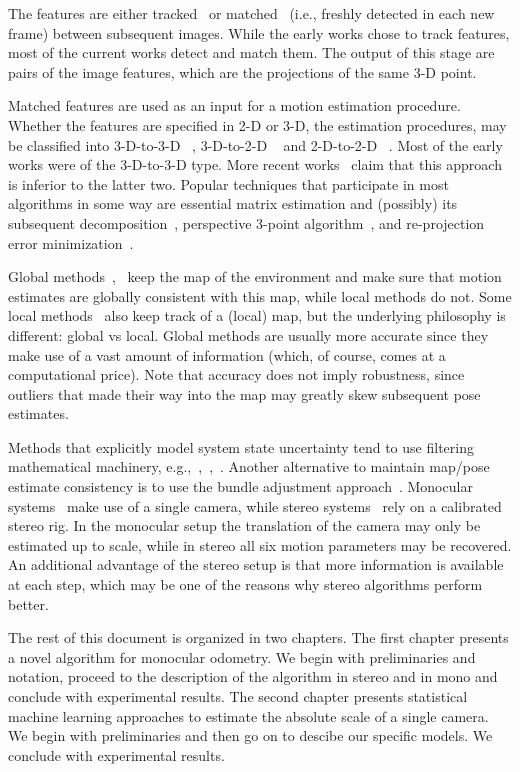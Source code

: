 The features are either tracked~\cite{Hedborg2009} or
matched~\cite{Geiger2011} (i.e., freshly detected in each new frame)
between subsequent images. While the early works chose to track
features, most of the current works detect and match them. The output
of this stage are pairs of the image features, which are the
projections of the same 3-D point.

Matched features are used as an input for a motion estimation
procedure.  Whether the features are specified in 2-D or 3-D, the
estimation procedures, may be classified into 3-D-to-3-D
~\cite{Milella2006}, 3-D-to-2-D ~\cite{Geiger2011} and 2-D-to-2-D
~\cite{Nister2004}. Most of the early works were of the 3-D-to-3-D
type.  More recent works~\cite{Nister2004} claim that this approach is
inferior to the latter two. Popular techniques that participate in
most algorithms in some way are essential matrix estimation and
(possibly) its subsequent decomposition~\cite{Nister2004}, perspective
3-point algorithm~\cite{Kneip1991}, and re-projection error
minimization~\cite{Geiger2011}.

Global methods~\cite{Klein2007},~\cite{Newcombe2011} keep the map of
the environment and make sure that motion estimates are globally
consistent with this map, while local methods do not.  Some local
methods~\cite{Badino2013} also keep track of a (local) map, but the
underlying philosophy is different: global vs local.  Global methods
are usually more accurate since they make use of a vast amount of
information (which, of course, comes at a computational price).  Note
that accuracy does not imply robustness, since outliers that made
their way into the map may greatly skew subsequent pose estimates.

Methods that explicitly model system state uncertainty tend to use
filtering mathematical machinery,
e.g.,~\cite{Konolige2010},~\cite{Olson2003},~\cite{Kaess2008}.
Another alternative to maintain map/pose estimate consistency is to
use the bundle adjustment approach~\cite{Triggs2000}. Monocular
systems~\cite{Song} make use of a single camera, while stereo
systems~\cite{Geiger2011} rely on a calibrated stereo rig. In the
monocular setup the translation of the camera may only be estimated up
to scale, while in stereo all six motion parameters may be
recovered. An additional advantage of the stereo setup is that more
information is available at each step, which may be one of the reasons
why stereo algorithms perform better.

The rest of this document is organized in two chapters.  The first
chapter presents a novel algorithm for monocular odometry.  We begin
with preliminaries and notation, proceed to the description of the
algorithm in stereo and in mono and conclude with experimental
results.  The second chapter presents statistical machine learning
approaches to estimate the absolute scale of a single camera.  We
begin with preliminaries and then go on to descibe our specific
models.  We conclude with experimental results.

